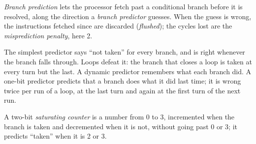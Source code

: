\begin{definition}\label{def:b2:processor-and-pipelining:prediction}
\emph{Branch prediction} lets the processor fetch past a conditional branch before it is
resolved, along the direction a \emph{branch predictor} guesses. When the guess is wrong,
the instructions fetched since are discarded (\emph{flushed}); the cycles lost are the \emph{misprediction
penalty}, here 2.
\end{definition}

The simplest predictor says ``not taken'' for every branch, and is right whenever the branch falls through. Loops
defeat it: the branch that closes a loop is taken at every turn but the last. A dynamic predictor remembers what
each branch did. A one-bit predictor predicts that a branch does what it did last time; it is wrong twice per run of
a loop, at the last turn and again at the first turn of the next run.

\begin{definition}\label{def:b2:processor-and-pipelining:counter}
A two-bit \emph{saturating counter} is a number from 0 to 3, incremented when the branch is
taken and decremented when it is not, without going past 0 or 3; it predicts ``taken'' when it is 2 or 3.
\end{definition}

\begin{omfigure}
\par{}
\end{omfigure}

